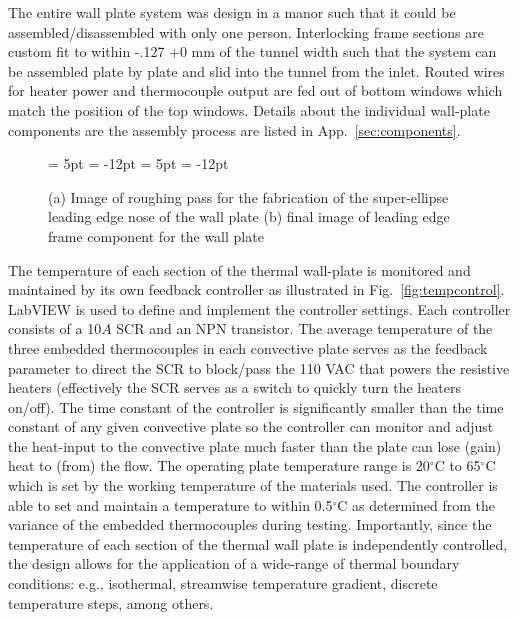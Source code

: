 The entire wall plate system was design in a manor such that it could be assembled/disassembled with only one person. 
Interlocking frame sections are custom fit to within -.127 +0 mm of the tunnel width such that the system can be assembled plate by plate and slid into the tunnel from the inlet.
Routed wires for heater power and thermocouple output are fed out of bottom windows which match the position of the top windows.
Details about the individual wall-plate components are the assembly process are listed in App.~\ref{sec:components}.

\begin{figure}[h!]
  \begin{center}
  {\subfigcapskip = 5pt \subfigcapmargin = -12pt }
   {\subfigcapskip = 5pt \subfigcapmargin = -12pt  }
  \end{center}
\caption{(a) Image of roughing pass for the fabrication of the super-ellipse leading edge nose of the wall plate (b) final image of leading edge frame component for the wall plate} 
\label{fig:nose}
\end{figure}

The temperature of each section of the thermal wall-plate is monitored and maintained by its own feedback controller as illustrated in Fig.~\ref{fig:tempcontrol}.  
LabVIEW is used to define and implement the controller settings. Each controller consists of a 10$A$ SCR and an NPN transistor. 
The average temperature of the three embedded thermocouples in each convective plate serves as the feedback parameter to direct the SCR to block/pass the 110 VAC that powers the resistive heaters (effectively the SCR serves as a switch to quickly turn the heaters on/off). 
The time constant of the controller is significantly smaller than the time constant of any given convective plate so the controller can monitor and adjust the heat-input to the convective plate much faster than the plate can lose (gain) heat to (from) the flow. 
The operating plate temperature range is 20$^\circ$C to 65$^\circ$C which is set by the working temperature of the materials used.
The controller is able to set and maintain a temperature to within 0.5$^\circ$C as determined from the variance of the embedded thermocouples during testing. 
Importantly, since the temperature of each section of the thermal wall plate is independently controlled, the design allows for the application of a wide-range of thermal boundary conditions: e.g., isothermal, streamwise temperature gradient, discrete temperature steps, among others.

